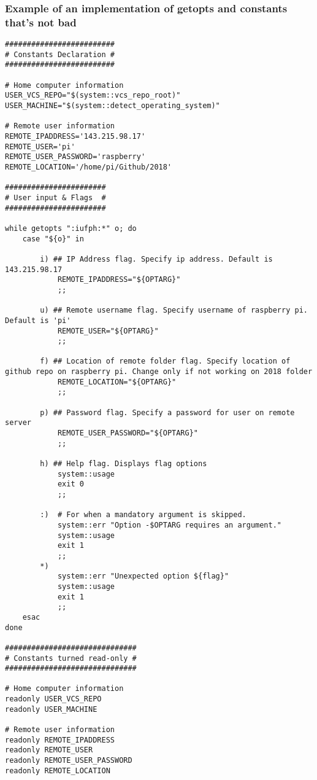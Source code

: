 \documentclass[11pt]{article}
\begin{document}
\subsubsection{Example of an implementation of getopts and constants that's not bad}
\label{sec:org7c2cd0b}
\begin{verbatim}
#########################
# Constants Declaration #
#########################

# Home computer information
USER_VCS_REPO="$(system::vcs_repo_root)"
USER_MACHINE="$(system::detect_operating_system)"

# Remote user information
REMOTE_IPADDRESS='143.215.98.17'
REMOTE_USER='pi'
REMOTE_USER_PASSWORD='raspberry'
REMOTE_LOCATION='/home/pi/Github/2018'

#######################
# User input & Flags  #
#######################

while getopts ":iufph:*" o; do
    case "${o}" in

        i) ## IP Address flag. Specify ip address. Default is 143.215.98.17
            REMOTE_IPADDRESS="${OPTARG}" 
            ;;

        u) ## Remote username flag. Specify username of raspberry pi. Default is 'pi'
            REMOTE_USER="${OPTARG}" 
            ;;

        f) ## Location of remote folder flag. Specify location of github repo on raspberry pi. Change only if not working on 2018 folder 
            REMOTE_LOCATION="${OPTARG}"
            ;;

        p) ## Password flag. Specify a password for user on remote server
            REMOTE_USER_PASSWORD="${OPTARG}"
            ;;

        h) ## Help flag. Displays flag options 
            system::usage
            exit 0
            ;;

        :)  # For when a mandatory argument is skipped.
            system::err "Option -$OPTARG requires an argument."
            system::usage
            exit 1
            ;;
        *) 
            system::err "Unexpected option ${flag}"
            system::usage
            exit 1 
            ;;
    esac
done

##############################
# Constants turned read-only #
##############################

# Home computer information
readonly USER_VCS_REPO
readonly USER_MACHINE

# Remote user information
readonly REMOTE_IPADDRESS
readonly REMOTE_USER
readonly REMOTE_USER_PASSWORD
readonly REMOTE_LOCATION
\end{verbatim}
\end{document}
